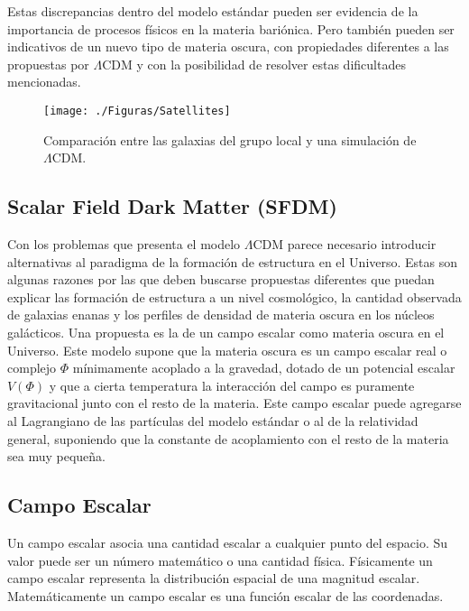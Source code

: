 \documentclass[a4paper,openright,12pt]{book}
\begin{document}
Estas discrepancias dentro del modelo estándar pueden ser evidencia de la importancia de procesos físicos en la materia bariónica. Pero también pueden ser indicativos de un nuevo tipo de materia oscura, con propiedades diferentes a las propuestas por $\Lambda$CDM y con la posibilidad de resolver estas dificultades mencionadas.

\begin{figure}
\centering
 \texttt{[image: ./Figuras/Satellites]}
 \caption{\footnotesize{Comparación entre las galaxias del grupo local y una simulación de $\Lambda$CDM.}}
\end{figure}





\subsection{Scalar Field Dark Matter (SFDM)}
Con los problemas que presenta el modelo $\Lambda$CDM parece necesario introducir alternativas al paradigma de la formación de estructura en el Universo. Estas son algunas razones por las que deben buscarse propuestas diferentes que puedan explicar las formación de estructura a un nivel cosmológico, la cantidad observada de galaxias enanas y los perfiles de densidad de materia oscura en los núcleos galácticos.
Una propuesta es la de un campo escalar como materia oscura en el Universo. Este modelo supone que la materia oscura es un campo escalar real o complejo $\Phi$ mínimamente acoplado a la gravedad, dotado de un potencial escalar $V(\Phi)$ y que a cierta temperatura la interacción  del campo es puramente gravitacional junto con el resto de la materia. Este campo escalar puede agregarse al Lagrangiano de las partículas del modelo estándar o al de la relatividad general, suponiendo que la constante de acoplamiento con el resto de la materia sea muy pequeña.

\subsection*{Campo Escalar}
Un campo escalar asocia una cantidad escalar a cualquier punto del espacio. Su valor puede ser un número matemático o una cantidad física. Físicamente un campo escalar representa la distribución espacial de una magnitud escalar. Matemáticamente un campo escalar es una función escalar de las coordenadas.
\end{document}
